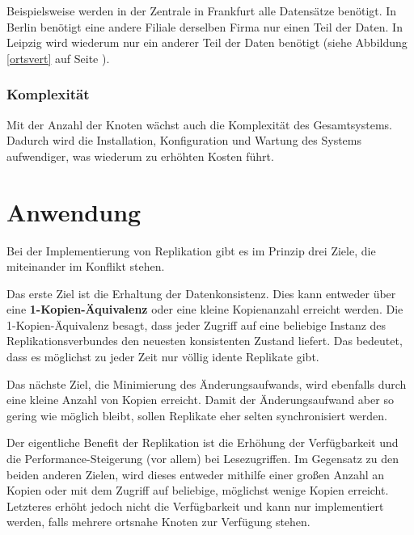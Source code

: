 Beispielsweise werden in der Zentrale in Frankfurt alle Datensätze benötigt. In Berlin benötigt eine andere Filiale derselben Firma nur einen Teil der Daten. In Leipzig wird wiederum nur ein anderer Teil der Daten benötigt (siehe Abbildung \ref{ortsvert} auf Seite \pageref{ortsvert}).

\subsubsection{Komplexität}

Mit der Anzahl der Knoten wächst auch die Komplexität des Gesamtsystems. Dadurch wird die Installation, Konfiguration und Wartung des Systems aufwendiger, was wiederum zu erhöhten Kosten führt.
\clearpage
\section{Anwendung}

Bei der Implementierung von Replikation gibt es im Prinzip drei Ziele, die miteinander im Konflikt stehen.

Das erste Ziel ist die Erhaltung der Datenkonsistenz. Dies kann entweder über eine \textbf{1-Kopien-Äquivalenz} oder eine kleine Kopienanzahl erreicht werden. Die 1-Kopien-Äquivalenz besagt, dass jeder Zugriff auf eine beliebige Instanz des Replikationsverbundes den neuesten konsistenten Zustand liefert. \cite{leipzig2} Das bedeutet, dass es möglichst zu jeder Zeit nur völlig idente Replikate gibt.

Das nächste Ziel, die Minimierung des Änderungsaufwands, wird ebenfalls durch eine kleine Anzahl von Kopien erreicht. Damit der Änderungsaufwand aber so gering wie möglich bleibt, sollen Replikate eher selten synchronisiert werden. \cite{leipzig2}

Der eigentliche Benefit der Replikation ist die Erhöhung der Verfügbarkeit und die Performance-Steigerung (vor allem) bei Lesezugriffen. Im Gegensatz zu den beiden anderen Zielen, wird dieses entweder mithilfe einer großen Anzahl an Kopien oder mit dem Zugriff auf beliebige, möglichst wenige Kopien erreicht. \cite{leipzig2} Letzteres erhöht jedoch nicht die Verfügbarkeit und kann nur implementiert werden, falls mehrere ortsnahe Knoten zur Verfügung stehen.

